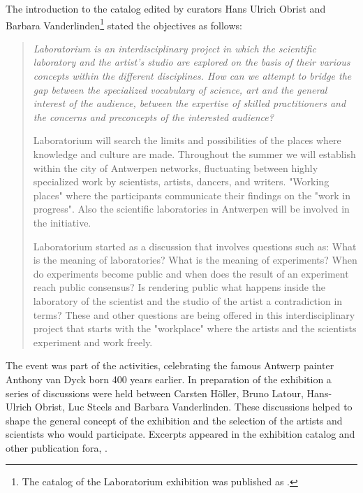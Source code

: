 The introduction to the catalog edited by curators Hans Ulrich Obrist
and Barbara Vanderlinden\footnote{
The catalog of the Laboratorium exhibition was published as 
\cite{Obrist:1999}.} stated the objectives as follows: 
\begin{quotation}
{\it Laboratorium is an interdisciplinary project in which the scientific laboratory and the artist's studio are explored
on the basis of their various concepts within the different disciplines. How can we attempt to bridge the gap between 
the specialized vocabulary of science, art and the general interest of the audience, between the expertise of skilled
practitioners and the concerns and preconcepts of the interested audience? 

Laboratorium will search the limits and possibilities of the places where knowledge and culture are made. Throughout 
the summer we will establish within the city of Antwerpen networks, fluctuating between highly specialized work by 
scientists, artists, dancers, and writers. "Working places" where the participants communicate their findings on the 
"work in progress". Also the scientific laboratories in Antwerpen will be involved in the initiative. 

Laboratorium started as a discussion that involves questions such as: What is the meaning of laboratories? What is 
the meaning of experiments? When do experiments become public and when does the result of an experiment reach 
public consensus? Is rendering public what happens inside the laboratory of the scientist and the studio of the 
artist a contradiction in terms? These and other questions are being offered in this interdisciplinary project 
that starts with the "workplace" where the artists and the scientists experiment and work freely.}
\end{quotation}

The event was part of the activities, celebrating the famous Antwerp painter Anthony van Dyck born 400 years earlier.
In preparation of the exhibition a series of discussions were held between  
Carsten H\"{o}ller, Bruno Latour, Hans-Ulrich Obrist, Luc Steels and Barbara Vanderlinden. These discussions helped 
to shape the general concept of the exhibition and the selection of the artists and scientists who would participate. 
Excerpts appeared in the exhibition catalog and other publication fora, \cite{Obrist:2003}. 

